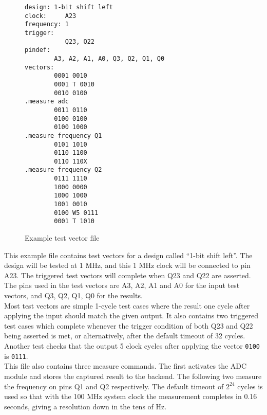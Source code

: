 \begin{figure}[h!]
\lstset{basicstyle=\scriptsize\ttfamily}
\begin{lstlisting}
design: 1-bit shift left
clock:     A23
frequency: 1
trigger:
           Q23, Q22
pindef:
        A3, A2, A1, A0, Q3, Q2, Q1, Q0
vectors:
        0001 0010
        0001 T 0010
        0010 0100
.measure adc
        0011 0110
        0100 0100
        0100 1000
.measure frequency Q1
        0101 1010
        0110 1100
        0110 110X
.measure frequency Q2
        0111 1110
        1000 0000
        1000 1000
        1001 0010
        0100 W5 0111
        0001 T 1010
\end{lstlisting}
\caption{Example test vector file}
\label{listing:testvec_example}
\end{figure}

This example file contains test vectors
for a design called ``1-bit shift left''. The design will be tested at 1 MHz, and
this 1 MHz clock will be connected to pin A23. The triggered test vectors
will complete when Q23 and Q22 are asserted. The pins used in the test vectors are
A3, A2, A1 and A0 for the input test vectors, and Q3, Q2, Q1, Q0 for the results.
\\

Most test vectors are simple 1-cycle test cases where the result one cycle after applying
the input should match the given output. It also contains two triggered test cases
which complete whenever the trigger condition of both Q23 and Q22 being asserted is met, or
alternatively, after the default timeout of 32 cycles. Another test checks that the
output 5 clock cycles after applying the vector \texttt{0100} is \texttt{0111}.
\\

This file also contains three measure commands. The first activates the ADC module and
stores the captured result to the backend. The following two measure the frequency on
pins Q1 and Q2 respectively. The default timeout of $2^{24}$ cycles is used so that with
the 100 MHz system clock the measurement completes in 0.16 seconds, giving a resolution
down in the tens of Hz.


